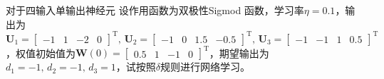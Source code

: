 \begin{example}
    对于四输入单输出神经元 设作用函数为双极性Sigmod 函数，学习率$\eta = 0.1$，输出为$\boldsymbol{U}_1 = \begin{bmatrix}
        -1 & 1 & -2 &0
    \end{bmatrix}^{\mathrm{T}},\,\boldsymbol{U}_2 = \begin{bmatrix}
        -1 & 0 & 1.5 & -0.5
    \end{bmatrix}^{\mathrm{T}},\,\boldsymbol{U}_3 = \begin{bmatrix}
        -1 & -1 & 1 & 0.5
    \end{bmatrix}^{\mathrm{T}}$，权值初始值为$\boldsymbol{W}(0) = \begin{bmatrix}
        0.5 & 1 & -1 & 0
    \end{bmatrix}^{\mathrm{T}}$，期望输出为$d_1 = -1,\,d_2 = -1,\, d_3 = 1$，试按照$\delta$规则进行网络学习。


\end{example}
